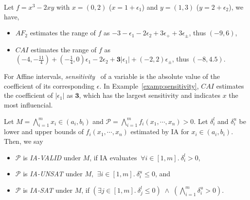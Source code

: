 \documentclass[runningheads,a4paper,oribibl]{llncs}
\newcommand{\suppress}[1]{} %
\begin{document}
\begin{example} \label{examp:sensitivity}
Let $f = x^3 - 2xy$ with $x = (0,2)$ ($x = 1 + \epsilon_1$) and $y=(1,3)$ ($y = 2+\epsilon_2$), 
we have,
\end{example}
\begin{itemize}
\item $AF_2$ estimates the range of $f$ as 
$-3 - \epsilon_1 - 2\epsilon_2 + 3\epsilon_+ + 3\epsilon_{\pm}$, thus $(-9,6)$,
\item $CAI$ estimates the range of $f$ as 
$(-4,-\frac{11}{4}) + (-\frac{1}{4}, 0)\epsilon_1 - 2\epsilon_2 + \textbf{3}|\epsilon_1| + (-2,2)\epsilon_{\pm}$, 
thus $(-8,4.5)$.
\end{itemize}

For Affine intervals, \emph{sensitivity}~\cite{ngocsefm} of a variable
is the absolute value of the coefficient of its corresponding $\epsilon$. 
In Example~\ref{examp:sensitivity}, 
$CAI$ estimates the coefficient of $|\epsilon_1|$ as $\textbf{3}$, 
which has the largest sensitivity and indicates $x$ the most influencial. 

\suppress{
\subsection{Interval Arithmetic as Over Approximation} \label{sec:ia}
Interval arithmetic (IA) is applied for estimating bounds of polynomials 
under a given input range (a box), and 
we use it as an over-approximation theory. 
We instantiate IA to $O.T$ in Section~\ref{sec:raSATloop}, and obtain the definition below. 
}

\begin{definition}
Let $M = \bigwedge \limits_{i=1}^m x_i \in (a_i,b_i)$ and 
${\mathcal P} = \bigwedge \limits_{i=1}^m f_i(x_1,\cdots,x_n) > 0$. 
%
Let $\delta_i^l$ and $\delta_i^u$ be lower and upper bounds of $f_i(x_1,\cdots,x_n)$ 
estimated by IA for $x_i \in (a_i,b_i)$. Then, we say 
%
\begin{itemize}
\item ${\mathcal P}$ is \emph{IA-VALID} under $M$, if IA evaluates 
$~\forall i \in [1,m].~\delta_i^l > 0$,
\item ${\mathcal P}$ is \emph{IA-UNSAT} under $M$, 
$~\exists i \in [1,m].~\delta_i^u \leq 0$, and 
\item ${\mathcal P}$ is \emph{IA-SAT} under $M$, if 
$(\exists j \in [1,m].~\delta_j^l \leq 0)\; \wedge \; 
	(\bigwedge \limits_{i=1}^m \delta_i^u > 0)$.
\end{itemize} 
\end{definition}
\end{document}
